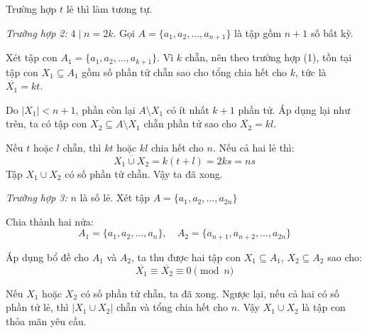 \documentclass[../09-contruction-methods.tex]{subfiles}
\begin{document}
\begin{soln}
	Trường hợp \( t \) lẻ thì làm tương tự.	
	
	\textit{Trường hợp 2:} \( 4 \mid n = 2k \).
	Gọi \( A = \{a_1, a_2, \dots, a_{n+1}\} \) là tập gồm \( n + 1 \) số bất kỳ.
	
	Xét tập con \( A_1 = \{a_1, a_2, \dots, a_{k+1}\} \). Vì \( k \) chẵn, nên theo trường hợp (1),
	tồn tại tập con \( X_1 \subseteq A_1 \) gồm số phần tử chẵn sao cho tổng chia hết cho \( k \), tức là \( \overline{X_1} = kt \).
	
	Do \( |X_1| < n + 1 \), phần còn lại \( A \setminus X_1 \) có ít nhất \( k + 1 \) phần tử.
	Áp dụng lại như trên, ta có tập con \( X_2 \subseteq A \setminus X_1 \) chẵn phần tử sao cho \( \overline{X_2} = kl \).
	
	Nếu \( t \) hoặc \( l \) chẵn, thì \( kt \) hoặc \( kl \) chia hết cho \( n \). Nếu cả hai lẻ thì:
	\[
		\overline{X_1 \cup X_2} = k(t + l) = 2ks = n s
	\]
	Tập \( X_1 \cup X_2 \) có số phần tử chẵn. Vậy ta đã xong.
	
	\textit{Trường hợp 3:}  \( n \) là số lẻ.
	Xét tập \( A = \{a_1, a_2, \dots, a_{2n}\} \)
	
	Chia thành hai nửa:
	\[
		A_1 = \{a_1, a_2, \dots, a_n\},\quad A_2 = \{a_{n+1}, a_{n+2}, \dots, a_{2n}\}
	\]
	
	Áp dụng bổ đề cho \( A_1 \) và \( A_2 \), ta thu được hai tập con \( X_1 \subseteq A_1 \), \( X_2 \subseteq A_2 \) sao cho:
	\[
		\overline{X_1} \equiv \overline{X_2} \equiv 0 \pmod{n}
	\]
	
	Nếu \( X_1 \) hoặc \( X_2 \) có số phần tử chẵn, ta đã xong. Ngược lại, nếu cả hai có số phần tử lẻ, thì \( |X_1 \cup X_2| \) chẵn và tổng chia hết cho \( n \).
	Vậy \( X_1 \cup X_2 \) là tập con thỏa mãn yêu cầu.
\end{soln}

\end{document}
